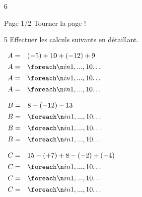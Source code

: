 \documentclass[a4paper]{book}
\begin{document}
{\begin{exerciceNote}{6}
\begin{enumerate}
            \points[38]
        \end{enumerate}
    \end{exerciceNote}


\vfill
Page 1/2 \hfill Tourner la page !
\newpage


    \begin{exerciceNote}{5}
        Effectuer les calculs suivants en détaillant.

        \begin{minipage}{0.30\linewidth}
            $\begin{array}{ll}
                A = & (-5)+10+(-12)+9 \\[1ex]
                A = & \points[10]\\[1ex]
                A = & \points[10]\\[1ex]
                A = & \points[10]
            \end{array}$

            \vspace{1cm}

            $\begin{array}{ll}
                B = & 8-(-12)-13 \\[1ex]
                B = & \points[10]\\[1ex]
                B = & \points[10]\\[1ex]
                B = & \points[10]
            \end{array}$
        \end{minipage}
        \hfill
        \begin{minipage}{0.30\linewidth}
            $\begin{array}{ll}
                C = & 15-(+7)+8-(-2)+(-4) \\[1ex]
                C = & \points[10] \\[1ex]
                C = & \points[10] \\[1ex]
                C = & \points[10]
            \end{array}$

            \vspace{1cm}


\end{minipage}
\end{exerciceNote}}
\end{document}
